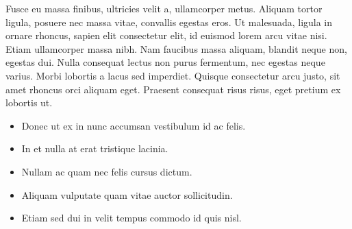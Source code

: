 \documentclass[a4paper,12pt]{article}
\begin{document}
Fusce eu massa finibus, ultricies velit a, ullamcorper metus. Aliquam tortor ligula, posuere nec massa vitae, convallis egestas eros. Ut malesuada, ligula in ornare rhoncus, sapien elit consectetur elit, id euismod lorem arcu vitae nisi. Etiam ullamcorper massa nibh. Nam faucibus massa aliquam, blandit neque non, egestas dui. Nulla consequat lectus non purus fermentum, nec egestas neque varius. Morbi lobortis a lacus sed imperdiet. Quisque consectetur arcu justo, sit amet rhoncus orci aliquam eget. Praesent consequat risus risus, eget pretium ex lobortis ut.

\begin{itemize}
 \item Donec ut ex in nunc accumsan vestibulum id ac felis.
 \item In et nulla at erat tristique lacinia.
 \item Nullam ac quam nec felis cursus dictum.
 \item Aliquam vulputate quam vitae auctor sollicitudin.
 \item Etiam sed dui in velit tempus commodo id quis nisl.
\end{itemize}
\end{document}
